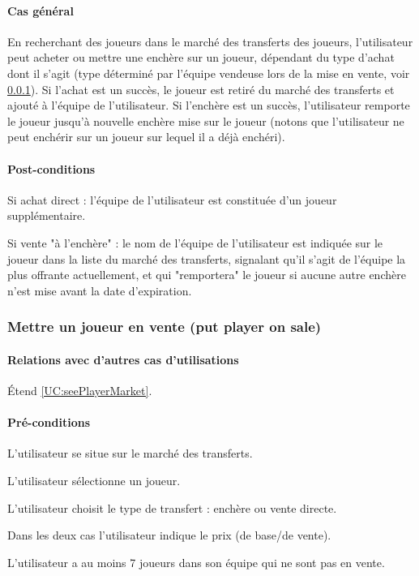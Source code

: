 \paragraph{Cas général}
En recherchant des joueurs dans le marché des transferts des joueurs, l'utilisateur peut acheter ou mettre une enchère sur un joueur, dépendant du type d'achat dont il s'agit (type déterminé par l'équipe vendeuse lors de la mise en vente, voir \ref{UC:putPlayerOnSale}). Si l'achat est un succès, le joueur est retiré du marché des transferts et ajouté à l'équipe de l'utilisateur. Si l'enchère est un succès, l'utilisateur remporte le joueur jusqu'à nouvelle enchère mise sur le joueur (notons que l'utilisateur ne peut enchérir sur un joueur sur lequel il a déjà enchéri). 
\paragraph{Post-conditions}
\begin{list}{}{\leftmargin=1.5em}
\item{Si achat direct : l'équipe de l'utilisateur est constituée d'un joueur supplémentaire.}
\item{Si vente "à l'enchère" : le nom de l'équipe de l'utilisateur est indiquée sur le joueur dans la liste du marché des transferts, signalant qu'il s'agit de l'équipe la plus offrante actuellement, et qui "remportera" le joueur si aucune autre enchère n'est mise avant la date d'expiration.}
\end{list}

\subsubsection{Mettre un joueur en vente (put player on sale)}
\label{UC:putPlayerOnSale}
\paragraph{Relations avec d'autres cas d'utilisations}
Étend \ref{UC:seePlayerMarket}.
\paragraph{Pré-conditions}
\begin{list}{}{\leftmargin=1.5em}
\item{L'utilisateur se situe sur le marché des transferts.}
\item{L'utilisateur sélectionne un joueur.}
\item{L'utilisateur choisit le type de transfert : enchère ou vente directe.}
\item{Dans les deux cas l'utilisateur indique le prix (de base/de vente).}
\item{L'utilisateur a au moins 7 joueurs dans son équipe qui ne sont pas en vente.}
\end{list}
